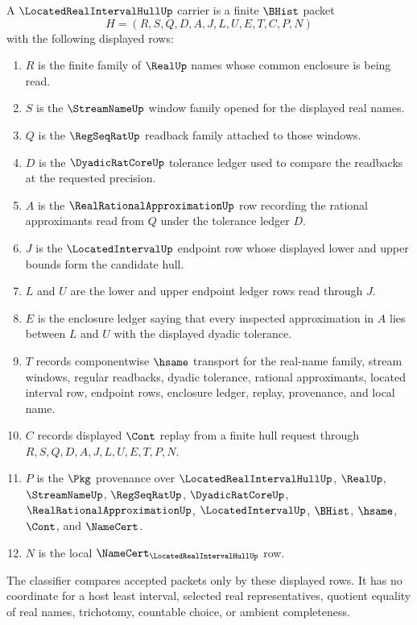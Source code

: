 \begin{definition}
\label{def:located-real-interval-hull-carrier}
A $\LocatedRealIntervalHullUp$ carrier is a finite $\BHist$ packet
$$
H=(R,S,Q,D,A,J,L,U,E,T,C,P,N)
$$
with the following displayed rows:
\begin{enumerate}
\item $R$ is the finite family of $\RealUp$ names whose common enclosure is being read.
\item $S$ is the $\StreamNameUp$ window family opened for the displayed real names.
\item $Q$ is the $\RegSeqRatUp$ readback family attached to those windows.
\item $D$ is the $\DyadicRatCoreUp$ tolerance ledger used to compare the readbacks at the requested precision.
\item $A$ is the $\RealRationalApproximationUp$ row recording the rational approximants read from $Q$ under the tolerance ledger $D$.
\item $J$ is the $\LocatedIntervalUp$ endpoint row whose displayed lower and upper bounds form the candidate hull.
\item $L$ and $U$ are the lower and upper endpoint ledger rows read through $J$.
\item $E$ is the enclosure ledger saying that every inspected approximation in $A$ lies between $L$ and $U$ with the displayed dyadic tolerance.
\item $T$ records componentwise $\hsame$ transport for the real-name family, stream windows, regular readbacks, dyadic tolerance, rational approximants, located interval row, endpoint rows, enclosure ledger, replay, provenance, and local name.
\item $C$ records displayed $\Cont$ replay from a finite hull request through $R,S,Q,D,A,J,L,U,E,T,P,N$.
\item $P$ is the $\Pkg$ provenance over $\LocatedRealIntervalHullUp$, $\RealUp$, $\StreamNameUp$, $\RegSeqRatUp$, $\DyadicRatCoreUp$, $\RealRationalApproximationUp$, $\LocatedIntervalUp$, $\BHist$, $\hsame$, $\Cont$, and $\NameCert$.
\item $N$ is the local $\NameCert_{\LocatedRealIntervalHullUp}$ row.
\end{enumerate}
The classifier compares accepted packets only by these displayed rows. It has no coordinate for a host least interval, selected real representatives, quotient equality of real names, trichotomy, countable choice, or ambient completeness.
\end{definition}


